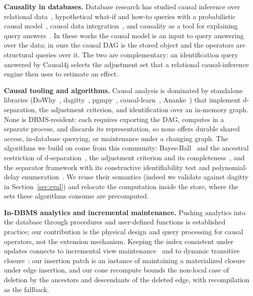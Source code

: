 \noindent\textbf{Causality in databases.} Database research has studied
causal inference over relational data~\cite{salimi2018hypdb,salimi2020carl},
hypothetical what-if and how-to queries with a probabilistic causal
model~\cite{galhotra2022hyper}, causal data
integration~\cite{youngmann2023integration}, and causality as a tool for
explaining query answers~\cite{meliou2014causality}. In these works the
causal model is an input to query answering over the data; in ours the causal
DAG is the stored object and the operators are structural queries over it.
The two are complementary: an identification query answered by Causal4j
selects the adjustment set that a relational causal-inference engine then
uses to estimate an effect.

\noindent\textbf{Causal tooling and algorithms.} Causal analysis is dominated
by standalone libraries (DoWhy~\cite{sharma2020dowhy},
dagitty~\cite{textor2016dagitty}, pgmpy~\cite{ankan2024pgmpy},
causal-learn~\cite{zheng2024causallearn}, Ananke~\cite{lee2023ananke}) that
implement d-separation, the adjustment criterion, and identification over an
in-memory graph. None is DBMS-resident: each requires exporting the DAG,
computes in a separate process, and discards its representation, so none
offers durable shared access, in-database querying, or maintenance under a
changing graph. The algorithms we build on come from this community:
Bayes-Ball~\cite{shachter1998bayesball} and the ancestral restriction of
d-separation~\cite{geiger1990identifying}, the adjustment criterion and its
completeness~\cite{shpitser2010validity,perkovic2018complete}, and the
separator framework with its constructive identifiability test and
polynomial-delay enumeration~\cite{textor2011adjustment,vanderzander2014constructing,vanderzander2019separators,vanderzander2020minimal}.
We reuse their semantics (indeed we validate against dagitty in
Section~\ref{sec:eval}) and relocate the computation inside the store, where
the sets these algorithms consume are precomputed.

\noindent\textbf{In-DBMS analytics and incremental maintenance.} Pushing
analytics into the database through procedures and user-defined functions is
established practice; our contribution is the physical design and query
processing for causal operators, not the extension mechanism. Keeping the
index consistent under updates connects to incremental view
maintenance~\cite{gupta1995maintenance} and to dynamic transitive
closure~\cite{demetrescu2004dynamic}: our insertion patch is an instance of
maintaining a materialized closure under edge insertion, and our cone
recompute bounds the non-local case of deletion by the ancestors and
descendants of the deleted edge, with recompilation as the fallback.
